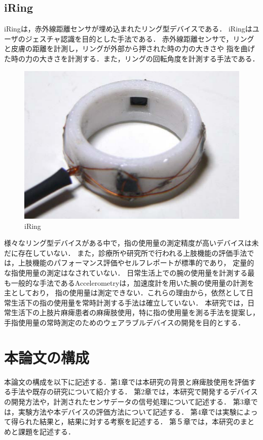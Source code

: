 \subsection*{iRing}
iRing\cite{Ogata2012}は，赤外線距離センサが埋め込まれたリング型デバイスである．
iRingはユーザのジェスチャ認識を目的とした手法である．
赤外線距離センサで，リングと皮膚の距離を計測し，リングが外部から押された時の力の大きさや
指を曲げた時の力の大きさを計測する．また，リングの回転角度を計測する手法である．
\begin{figure}[H]
  \centering
  \includegraphics[width=0.6\linewidth]{fig/ch1/iring}
  \caption{iRing\cite{Ogata2012}}
  \label{fig:iring}
\end{figure}

様々なリング型デバイスがある中で，指の使用量の測定精度が高いデバイスは未だに存在していない．
また，診療所や研究所で行われる上肢機能の評価手法では，上肢機能のパフォーマンス評価やセルフレポートが標準的であり，
定量的な指使用量の測定はなされていない．
日常生活上での腕の使用量を計測する最も一般的な手法であるAccelerometryは，加速度計を用いた腕の使用量の計測を主としており，
指の使用量は測定できない．これらの理由から，依然として日常生活下の指の使用量を常時計測する手法は確立していない．
本研究では，日常生活下の上肢片麻痺患者の麻痺肢使用，特に指の使用量を測る手法を提案し，手指使用量の常時測定のためのウェアラブルデバイスの開発を目的とする．


\section{本論文の構成}
本論文の構成を以下に記述する．第1章では本研究の背景と麻痺肢使用を評価する手法や既存の研究について紹介する．
第2章では，本研究で開発するデバイスの開発方法や，計測されたセンサデータの信号処理について記述する．
第3章では，実験方法や本デバイスの評価方法について記述する．
第4章では実験によって得られた結果と，結果に対する考察を記述する．
第５章では，本研究のまとめと課題を記述する．